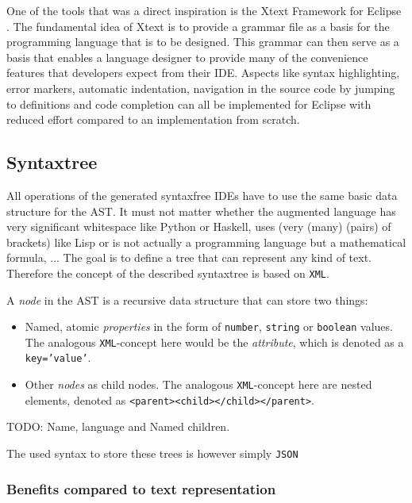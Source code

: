 One of the tools that was a direct inspiration is the Xtext Framework for Eclipse \cite{efftinge_xtext}. The fundamental idea of Xtext is to provide a grammar file as a basis for the programming language that is to be designed. This grammar can then serve as a basis that enables a language designer to provide many of the convenience features that developers expect from their IDE. Aspects like syntax highlighting, error markers, automatic indentation, navigation in the source code by jumping to definitions and code completion can all be implemented for Eclipse with reduced effort compared to an implementation from scratch.

\subsection{Syntaxtree}

All operations of the generated syntaxfree IDEs have to use the same basic data structure for the AST. It must not matter whether the augmented language has very significant whitespace like Python or Haskell, uses (very (many) (pairs) of brackets) like Lisp or is not actually a programming language but a mathematical formula, ... The goal is to define a tree that can represent any kind of text. Therefore the concept of the described syntaxtree is based on \texttt{XML}\cite{xml_spec}.

A \textit{node} in the AST is a recursive data structure that can store two things:

\begin{itemize}
\item Named, atomic \textit{properties} in the form of \texttt{number}, \texttt{string} or \texttt{boolean} values. The analogous \texttt{XML}-concept here would be the \textit{attribute}, which is denoted as a \texttt{key='value'}.
\item Other \textit{nodes} as child nodes. The analogous \texttt{XML}-concept here are nested elements, denoted as \texttt{<parent><child></child></parent>}.
\end{itemize}

TODO: Name, language and Named children.

The used syntax to store these trees is however simply \texttt{JSON}

\subsubsection{Benefits compared to text representation}

